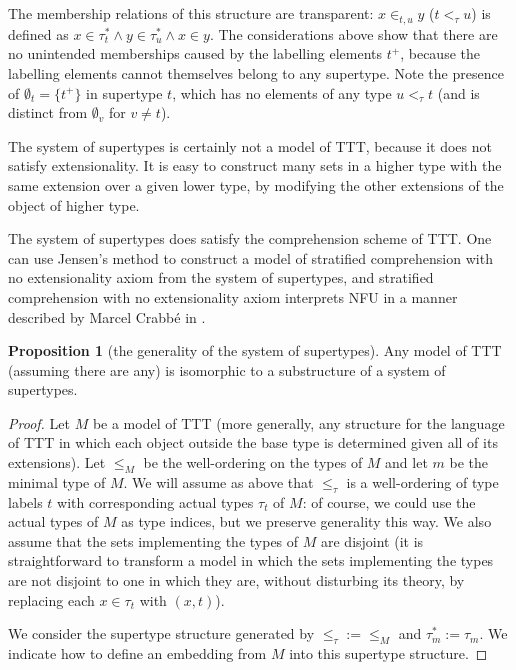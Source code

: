 \documentclass{article}
\theoremstyle{definition}
\newtheorem{proposition}[theorem]{Proposition}
\theoremstyle{remark}
\begin{document}
{The membership relations of this structure are transparent:  $x \in_{t,u} y$ ($t <_\tau u$) is defined as
$x \in \tau^*_t \wedge y \in \tau^*_u \wedge x \in y$.   The considerations above show that there are no unintended memberships caused by the labelling elements $t^+$, because the labelling elements cannot themselves belong to any supertype.  Note the presence of $\emptyset_t = \{t^+\}$ in supertype $t$, which has no elements of any type $u <_\tau t$ (and is distinct from $\emptyset_v$ for $v \neq t$).

The system of supertypes is certainly not a model of TTT, because it does not satisfy extensionality.  It is easy to construct
many sets in a higher type with the same extension over a given lower type, by modifying the other extensions of the object of higher type.

The system of supertypes does satisfy the comprehension scheme of TTT.  One can use Jensen's method to construct a model of stratified comprehension with no extensionality axiom from the system of supertypes, and stratified comprehension with no extensionality axiom interprets NFU in a manner described by Marcel Crabb\'e in \cite{marcelsf}.

\begin{proposition}[the generality of the system of supertypes]
Any model of TTT (assuming there are any) is isomorphic to a substructure of a system of supertypes.
\end{proposition}
\begin{proof}
Let $M$ be a model of TTT (more generally, any structure for the language of TTT in which each object outside the base type is determined given all of its extensions).  Let $\leq_M$ be the well-ordering on the types of $M$ and let $m$ be the minimal type of $M$.  We will assume as above that $\leq_\tau$ is a well-ordering of type labels $t$ with corresponding actual types $\tau_t$ of $M$:  of course, we could use the actual types of $M$ as type indices, but we preserve generality this way.    We also assume that the sets implementing the types of $M$ are disjoint (it is straightforward to transform a model in which the sets implementing the types are not disjoint to one in which they are, without disturbing its theory, by replacing each $x \in \tau_t$ with $(x,t)$).

We consider the supertype structure generated by ${\leq_\tau}:={\leq_M}$ and $\tau^*_m := \tau_m$.  We indicate how to define an embedding from $M$ into this supertype structure.


\end{proof}}
\end{document}
